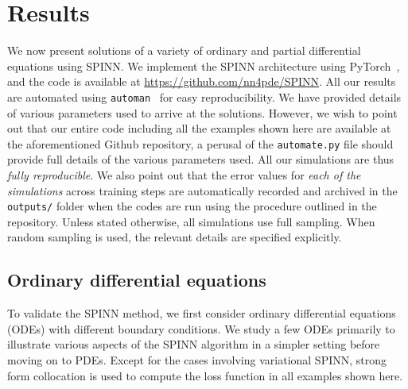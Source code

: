 \documentclass[12pt]{article}
\newcommand{\rr}[1]{#1}
\newcommand{\rb}[1]{#1}
\newcommand{\new}[1]{#1}
\begin{document}
\section{Results}
We now present solutions of a variety of ordinary and partial differential equations using SPINN. We implement the SPINN architecture using PyTorch~\cite{pytorch}, and the code is available at \url{https://github.com/nn4pde/SPINN}. All our results are automated using \verb|automan|~\cite{automan:2018} for easy reproducibility. \rb{We have provided details of various parameters used to arrive at the solutions. However, we wish to point out that our entire code including all the examples shown here are available at the aforementioned Github repository, a perusal of the \texttt{automate.py} file should provide full details of the various parameters used. All our simulations are thus \emph{fully reproducible}.} \rr{We also point out that the error values for \emph{each of the simulations} across training steps are automatically recorded and archived in the \texttt{outputs/} folder when the codes are run using the procedure outlined in the repository. Unless stated otherwise, all simulations use full sampling.  When random sampling is used, the relevant details are specified explicitly.}

\subsection{Ordinary differential equations}
To validate the SPINN method, we first consider ordinary differential equations (ODEs) with different boundary conditions. \new{We study a few ODEs primarily to illustrate various aspects of the SPINN algorithm in a simpler setting before moving on to PDEs.} Except for the cases involving variational SPINN, strong form collocation is used to compute the loss function in all examples shown here.
\end{document}
